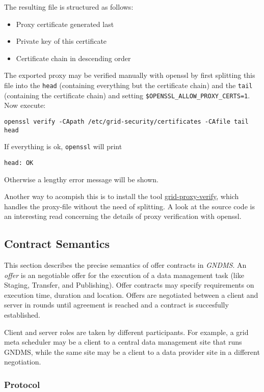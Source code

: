 \documentclass{article}
\begin{document}
The resulting file is structured as follows:

\begin{itemize}
\item
  Proxy certificate generated last
\item
  Private key of this certificate
\item
  Certificate chain in descending order
\end{itemize}
The exported proxy may be verified manually with openssl by first
splitting this file into the \verb!head! (containing everything but
the certificate chain) and the \verb!tail! (containing the
certificate chain) and setting \verb!$OPENSSL_ALLOW_PROXY_CERTS=1!.
Now execute:

\begin{verbatim}
openssl verify -CApath /etc/grid-security/certificates -CAfile tail head
\end{verbatim}
If everything is ok, \verb!openssl! will print

\begin{verbatim}
head: OK
\end{verbatim}
Otherwise a lengthy error message will be shown.

Another way to acompish this is to install the tool
\href{http://www.nikhef.nl/~janjust/proxy-verify/}{grid-proxy-verify},
which handles the proxy-file without the need of splitting. A look
at the source code is an interesting read concerning the details of
proxy verification with openssl.

\subsection{Contract Semantics}

This section describes the precise semantics of offer contracts in
\emph{GNDMS}. An \emph{offer} is an negotiable offer for the
execution of a data management task (like Staging, Transfer, and
Publishing). Offer contracts may specify requirements on execution
time, duration and location. Offers are negotiated between a client
and server in rounds until agreement is reached and a contract is
succesfully established.

Client and server roles are taken by different participants. For
example, a grid meta scheduler may be a client to a central data
management site that runs GNDMS, while the same site may be a
client to a data provider site in a different negotiation.

\subsubsection{Protocol}
\end{document}
